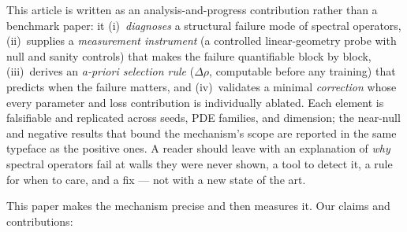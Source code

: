 \documentclass[11pt]{article}
\theoremstyle{definition}
\begin{document}
This article is written as an analysis-and-progress contribution rather than
a benchmark paper: it (i)~\emph{diagnoses} a structural failure mode of
spectral operators, (ii)~supplies a \emph{measurement instrument} (a
controlled linear-geometry probe with null and sanity controls) that makes
the failure quantifiable block by block, (iii)~derives an \emph{a-priori
selection rule} ($\Delta\rho$, computable before any training) that predicts
when the failure matters, and (iv)~validates a minimal \emph{correction}
whose every parameter and loss contribution is individually ablated. Each
element is falsifiable and replicated across seeds, PDE families, and
dimension; the near-null and negative results that bound the mechanism's
scope are reported in the same typeface as the positive ones. A reader
should leave with an explanation of \emph{why} spectral operators fail at
walls they were never shown, a tool to detect it, a rule for when to care,
and a fix --- not with a new state of the art.

This paper makes the mechanism precise and then measures it. Our claims and
contributions:
\end{document}
